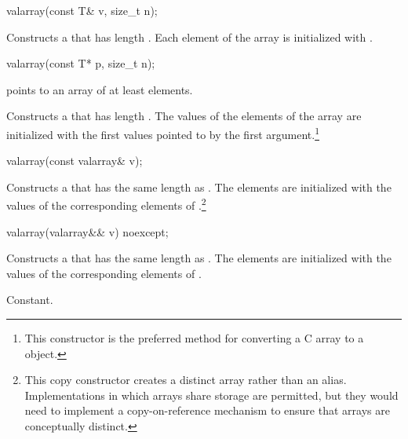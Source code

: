 %
\begin{itemdecl}
valarray(const T& v, size_t n);
\end{itemdecl}

\begin{itemdescr}
\pnum
\effects
Constructs a  that has length .
Each element of the array is initialized with .
\end{itemdescr}

%
\begin{itemdecl}
valarray(const T* p, size_t n);
\end{itemdecl}

\begin{itemdescr}
\pnum
\requires
{} points to an array of at least
 elements.

\effects
Constructs a  that has length .
The values of the elements of the array are initialized with the
first
values pointed to by the first argument.\footnote{This constructor is the
preferred method for converting a C array to a
object.}
\end{itemdescr}

%
\begin{itemdecl}
valarray(const valarray& v);
\end{itemdecl}

\begin{itemdescr}
\pnum
\effects
Constructs a  that has the same length as .
The elements are initialized with the values of the corresponding
elements of .\footnote{This copy constructor creates
a distinct array rather than an alias.
Implementations in which arrays share storage are permitted, but they
would need to implement a copy-on-reference mechanism to ensure that arrays are
conceptually distinct.}
\end{itemdescr}

%
\begin{itemdecl}
valarray(valarray&& v) noexcept;
\end{itemdecl}

\begin{itemdescr}
\pnum
\effects
Constructs a  that has the same length as .
The elements are initialized with the values of the corresponding
elements of .

\pnum
\complexity Constant.
\end{itemdescr}

